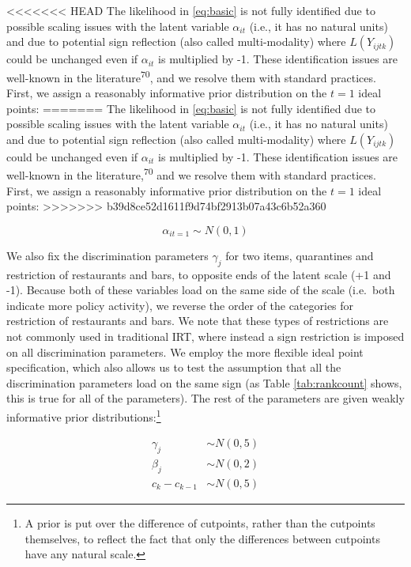 \documentclass[]{article}
\let\rmarkdownfootnote\footnote%
\def\footnote{\protect\rmarkdownfootnote}
\begin{document}
<<<<<<< HEAD
The likelihood in \eqref{eq:basic} is not fully identified due to possible scaling issues with the latent variable \(\alpha_{it}\) (i.e., it has no natural units) and due to potential sign reflection (also called multi-modality) where \(L(Y_{ijtk})\) could be unchanged even if \(\alpha_{it}\) is multiplied by -1. These identification issues are well-known in the literature\textsuperscript{70}, and we resolve them with standard practices. First, we assign a reasonably informative prior distribution on the \(t=1\) ideal points:
=======
The likelihood in \eqref{eq:basic} is not fully identified due to possible scaling issues with the latent variable \(\alpha_{it}\) (i.e., it has no natural units) and due to potential sign reflection (also called multi-modality) where \(L(Y_{ijtk})\) could be unchanged even if \(\alpha_{it}\) is multiplied by -1. These identification issues are well-known in the literature,\textsuperscript{70} and we resolve them with standard practices. First, we assign a reasonably informative prior distribution on the \(t=1\) ideal points:
>>>>>>> b39d8ce52d1611f9d74bf2913b07a43c6b52a360

\begin{equation}
\alpha_{it=1} \sim N(0,1)
\label{eq:id1}
\end{equation}

We also fix the discrimination parameters \(\gamma_j\) for two items, quarantines and restriction of restaurants and bars, to opposite ends of the latent scale (+1 and -1). Because both of these variables load on the same side of the scale (i.e.~both indicate more policy activity), we reverse the order of the categories for restriction of restaurants and bars. We note that these types of restrictions are not commonly used in traditional IRT, where instead a sign restriction is imposed on all discrimination parameters. We employ the more flexible ideal point specification, which also allows us to test the assumption that all the discrimination parameters load on the same sign (as Table \ref{tab:rankcount} shows, this is true for all of the parameters). The rest of the parameters are given weakly informative prior distributions:\footnote{A prior is put over the difference of cutpoints, rather than the cutpoints themselves, to reflect the fact that only the differences between cutpoints have any natural scale.}

\begin{align}
\gamma_j &\sim N(0,5)\\
\beta_j &\sim N(0,2)\\
c_k - c_{k-1} &\sim N(0,5)
\label{eq:id2}
\end{align}
\end{document}

